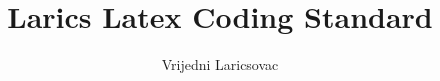 \documentclass[11pt]{article}
\begin{document}
\title{Larics Latex Coding Standard}
\author{Vrijedni Laricsovac}
\maketitle






\appendix





\end{document}
